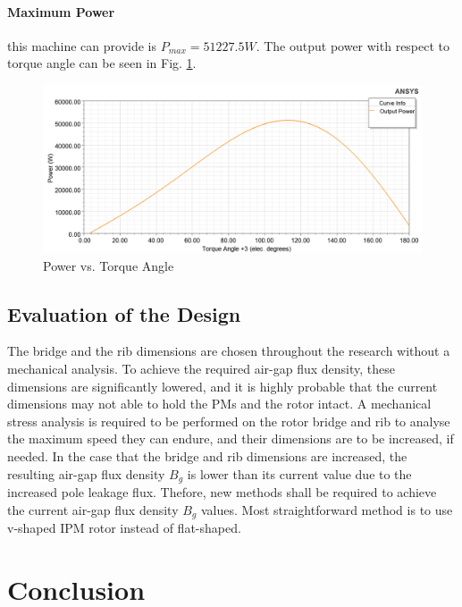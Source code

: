 \documentclass [a4 paper, 11pt, titlepage] {article}
\begin{document}
	\paragraph{Maximum Power} this machine can provide is $P_{max}=51227.5W$. The output power with respect to torque angle can be seen in Fig. \ref{fig:PvsTangle}.
	\begin{figure}[h]
		\includegraphics[width=\textwidth]{maxpower.png}
		\caption{Power vs. Torque Angle}
		\label{fig:PvsTangle}
	\end{figure}
	
	\subsection{Evaluation of the Design}
	
	The bridge and the rib dimensions are chosen throughout the research without a mechanical analysis. To achieve the required air-gap flux density, these dimensions are significantly lowered, and it is highly probable that the current dimensions may not able to hold the PMs and the rotor intact. A mechanical stress analysis is required to be performed on the rotor bridge and rib to analyse the maximum speed they can endure, and their dimensions are to be increased, if needed. In the case that the bridge and rib dimensions are increased, the resulting air-gap flux density $B_g$ is lower than its current value due to the increased pole leakage flux. Thefore, new methods shall be required to achieve the current air-gap flux density $B_g$ values. Most straightforward method is to use v-shaped IPM rotor instead of flat-shaped.
		
	\section{Conclusion}
	
\end{document}

